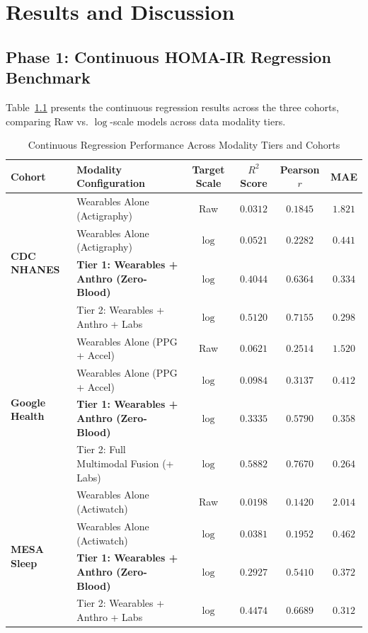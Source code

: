 \documentclass[12pt,a4paper,oneside]{report}
\begin{document}
\chapter{Results and Discussion}

\section{Phase 1: Continuous HOMA-IR Regression Benchmark}
Table~\ref{tab:regression_benchmark} presents the continuous regression results across the three cohorts, comparing Raw vs. $\log$-scale models across data modality tiers.

\begin{table}[h!]
\centering
\small
\caption{Continuous Regression Performance Across Modality Tiers and Cohorts}
\begin{tabularx}{\textwidth}{llcccc}
\toprule
\textbf{Cohort} & \textbf{Modality Configuration} & \textbf{Target Scale} & \textbf{$R^2$ Score} & \textbf{Pearson $r$} & \textbf{MAE} \\
\midrule
\multirow{4}{*}{\textbf{CDC NHANES}} 
 & Wearables Alone (Actigraphy) & Raw & $0.0312$ & $0.1845$ & $1.821$ \\
 & Wearables Alone (Actigraphy) & $\log$ & $0.0521$ & $0.2282$ & $0.441$ \\
 & \textbf{Tier 1: Wearables + Anthro (Zero-Blood)} & \textbf{$\log$} & \textbf{$0.4044$} & \textbf{$0.6364$} & \textbf{$0.334$} \\
 & Tier 2: Wearables + Anthro + Labs & $\log$ & $0.5120$ & $0.7155$ & $0.298$ \\
\midrule
\multirow{4}{*}{\textbf{Google Health}} 
 & Wearables Alone (PPG + Accel) & Raw & $0.0621$ & $0.2514$ & $1.520$ \\
 & Wearables Alone (PPG + Accel) & $\log$ & $0.0984$ & $0.3137$ & $0.412$ \\
 & \textbf{Tier 1: Wearables + Anthro (Zero-Blood)} & \textbf{$\log$} & \textbf{$0.3335$} & \textbf{$0.5790$} & \textbf{$0.358$} \\
 & Tier 2: Full Multimodal Fusion (+ Labs) & $\log$ & $0.5882$ & $0.7670$ & $0.264$ \\
\midrule
\multirow{4}{*}{\textbf{MESA Sleep}} 
 & Wearables Alone (Actiwatch) & Raw & $0.0198$ & $0.1420$ & $2.014$ \\
 & Wearables Alone (Actiwatch) & $\log$ & $0.0381$ & $0.1952$ & $0.462$ \\
 & \textbf{Tier 1: Wearables + Anthro (Zero-Blood)} & \textbf{$\log$} & \textbf{$0.2927$} & \textbf{$0.5410$} & \textbf{$0.372$} \\
 & Tier 2: Wearables + Anthro + Labs & $\log$ & $0.4474$ & $0.6689$ & $0.312$ \\
\bottomrule
\end{tabularx}
\label{tab:regression_benchmark}
\end{table}
\end{document}
